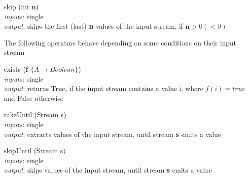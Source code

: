 \documentclass{dithesis}
\begin{document}
\begin{description}
\begin{minipage}[c]{0.4\linewidth}
\item[skip] (int \textbf{n}) \\
	\textit{inputs}: single \\
	\textit{output}: skips the first (last) \textbf{n} values of the input stream, if $\textbf{n} > 0 (< 0)$
\end{minipage}
\begin{minipage}[c]{0.6\linewidth}

\end{minipage}

\end{description}

The following operators behave depending on some conditions on their input stream
\begin{description}

\begin{minipage}[c]{0.4\linewidth}
\item[exists] (\textbf{f} $\{ A \to Boolean \}$) \\
	\textit{inputs}: single \\
	\textit{output}: returns True, if the input stream contains a value i, where $f(i) = true$ and False otherwise
\end{minipage}
\begin{minipage}[c]{0.6\linewidth}

\end{minipage}

\begin{minipage}[c]{0.4\linewidth}
\item[takeUntil] (Stream s) \\
	\textit{inputs}: single \\
	\textit{output}: extracts values of the input stream, until stream \textbf{s} emits a value
\end{minipage}
\begin{minipage}[c]{0.6\linewidth}

\end{minipage}

\begin{minipage}[c]{0.4\linewidth}
\item[skipUntil] (Stream s) \\
	\textit{inputs}: single \\
	\textit{output}: skips values of the input stream, until stream \textbf{s} emits a value
\end{minipage}
\begin{minipage}[c]{0.6\linewidth}

\end{minipage}


\end{description}
\end{document}

